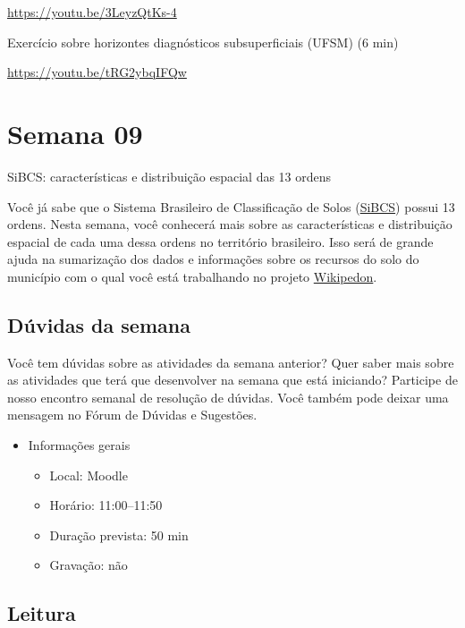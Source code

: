 \documentclass[
  11pt,
  a4paper,
  dvipsnames]{tufte-book}
\providecommand{\tightlist}{%
  \setlength{\itemsep}{0pt}\setlength{\parskip}{0pt}}
\begin{document}
\url{https://youtu.be/3LeyzQtKs-4}

Exercício sobre horizontes diagnósticos subsuperficiais (UFSM) (6 min)

\url{https://youtu.be/tRG2ybqIFQw}

\hypertarget{semana-09}{%
\chapter{Semana 09}\label{semana-09}}

SiBCS: características e distribuição espacial das 13 ordens

Você já sabe que o Sistema Brasileiro de Classificação de Solos (\href{https://www.embrapa.br/en/solos/sibcs}{SiBCS}) possui 13 ordens. Nesta semana, você conhecerá mais sobre as características e distribuição espacial de cada uma dessa ordens no território brasileiro. Isso será de grande ajuda na sumarização dos dados e informações sobre os recursos do solo do município com o qual você está trabalhando no projeto \href{https://pt.wikiversity.org/wiki/Wikipedon}{Wikipedon}.

\hypertarget{duxfavidas-da-semana-7}{%
\section{Dúvidas da semana}\label{duxfavidas-da-semana-7}}

Você tem dúvidas sobre as atividades da semana anterior? Quer saber mais sobre as atividades que terá que desenvolver na semana que está iniciando? Participe de nosso encontro semanal de resolução de dúvidas. Você também pode deixar uma mensagem no Fórum de Dúvidas e Sugestões.

\begin{itemize}
\tightlist
\item
  Informações gerais

  \begin{itemize}
  \tightlist
  \item
    Local: Moodle
  \item
    Horário: 11:00--11:50
  \item
    Duração prevista: 50 min
  \item
    Gravação: não
  \end{itemize}
\end{itemize}

\hypertarget{leitura-7}{%
\section{Leitura}\label{leitura-7}}
\end{document}
